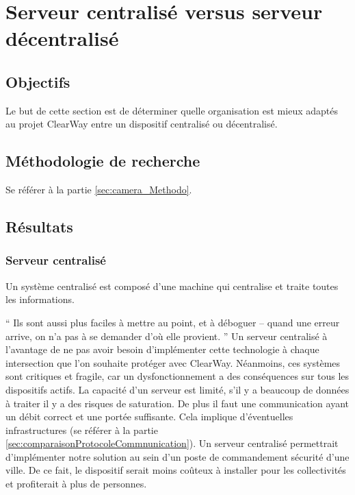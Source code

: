 
\section{Serveur centralisé versus serveur décentralisé}
\label{sec:centralise}

\subsection{Objectifs}
\label{sec:centralise_Objectifs}
Le but de cette section est de déterminer quelle organisation est mieux adaptés au projet ClearWay entre un dispositif centralisé ou décentralisé.

\subsection{Méthodologie de recherche}
\label{sec:centralise_Methodo}
Se référer à la partie \ref{sec:camera_Methodo}.

\subsection{Résultats}
\label{sec:centralise_Resultats}

\subsubsection{Serveur centralisé}
\label{sec:centralise_centralise}
Un système centralisé est composé d'une machine qui centralise et traite toutes les informations.

\enquote{
    Ils sont aussi plus faciles à mettre au point, et à déboguer – quand une erreur arrive, on n’a pas à se demander d’où elle provient. \cite{centraliser}
}
Un serveur centralisé à l'avantage de ne pas avoir besoin d'implémenter cette technologie à chaque intersection que l'on souhaite protéger avec ClearWay.
Néanmoins, ces systèmes sont critiques et fragile, car un dysfonctionnement a des conséquences sur tous les dispositifs actifs.
La capacité d'un serveur est limité, s'il y a beaucoup de données à traiter il y a des risques de saturation.
De plus il faut une communication ayant un débit correct et une portée suffisante. Cela implique d'éventuelles infrastructures (se référer à la partie \ref{sec:comparaisonProtocoleCommnunication}).
Un serveur centralisé permettrait d'implémenter notre solution au sein d'un poste de commandement sécurité d'une ville. De ce fait,
le dispositif serait moins coûteux à installer pour les collectivités et profiterait à plus de personnes.

